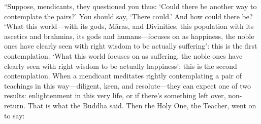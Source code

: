 \documentclass[12pt,openany]{book}%
\begin{document}
“Suppose, mendicants, they questioned you thus: ‘Could there be another way to contemplate the pairs?’ You should say, ‘There could.’ And how could there be? ‘What this world—with its gods, \textsanskrit{Māras}, and Divinities, this population with its ascetics and brahmins, its gods and humans—focuses on as happiness, the noble ones have clearly seen with right wisdom to be actually suffering’: this is the first contemplation. ‘What this world focuses on as suffering, the noble ones have clearly seen with right wisdom to be actually happiness’: this is the second contemplation. When a mendicant meditates rightly contemplating a pair of teachings in this way—diligent, keen, and resolute—they can expect one of two results: enlightenment in this very life, or if there’s something left over, non-return. That is what the Buddha said. Then the Holy One, the Teacher, went on to say: 
\end{document}

